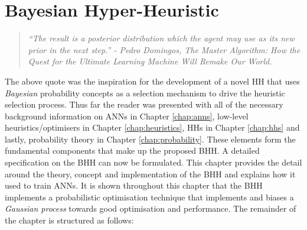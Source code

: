 \chapter{Bayesian Hyper-Heuristic}
\label{chap:bhh}

\begin{quote}
    \textit{
    ``The result is a posterior distribution which the agent may use as its new prior in the next step.'' - Pedro Domingos, The Master Algorithm: How the Quest for the Ultimate Learning Machine Will Remake Our World.
    }
\end{quote}

The above quote was the inspiration for the development of a novel \ac{HH} that uses \textit{Bayesian} probability concepts as a selection mechanism to drive the heuristic selection process. Thus far the reader was presented with all of the necessary background information on \acp{ANN} in Chapter \ref{chap:anns}, low-level heuristics/optimisers in Chapter \ref{chap:heuristics}, \acp{HH} in Chapter \ref{chap:hhs}  and lastly, probability theory in Chapter \ref{chap:probability}. These elements form the fundamental components that make up the proposed \Ac{BHH}. A detailed specification on the \Ac{BHH} can now be formulated. This chapter provides the detail around the theory, concept and implementation of the \Ac{BHH} and explains how it used to train \acp{ANN}. It is shown throughout this chapter that the \Ac{BHH} implements a probabilistic optimisation technique that implements and biases a \textit{Gaussian process} towards good optimisation and performance. The remainder of the chapter is structured as follows: 

